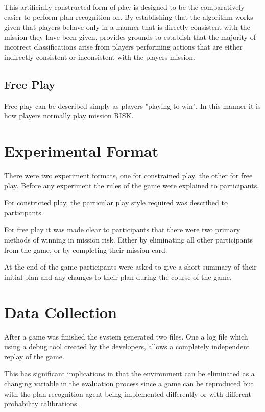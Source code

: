 \documentclass[parskip]{cs4rep}
\begin{document}
This artificially constructed form of play is designed to be the comparatively easier to perform plan recognition on. By establishing that the algorithm works given that players behave only in a manner that is directly consistent with the mission they have been given, provides grounds to establish that the majority of incorrect classifications arise from players performing actions that are either indirectly consistent or inconsistent with the players mission.

\subsection{Free Play}

Free play can be described simply as players "playing to win". In this manner it is how players normally play mission RISK.

\section{Experimental Format}

There were two experiment formats, one for constrained play, the other for free play. Before any experiment the rules of the game were explained to participants. 

For constricted play, the particular play style required was described to participants.

For free play it was made clear to participants that there were two primary methods of winning in mission risk. Either by eliminating all other participants from the game, or by completing their mission card.

At the end of the game participants were asked to give a short summary of their initial plan and any changes to their plan during the course of the game.

\section{Data Collection}

After a game was finished the system generated two files. One a log file which using a debug tool created by the developers, allows a completely independent replay of the game. 

This has significant implications in that the environment can be eliminated as a changing variable in the evaluation process since a game can be reproduced but with the plan recognition agent being implemented differently or with different probability calibrations. 
\end{document}
